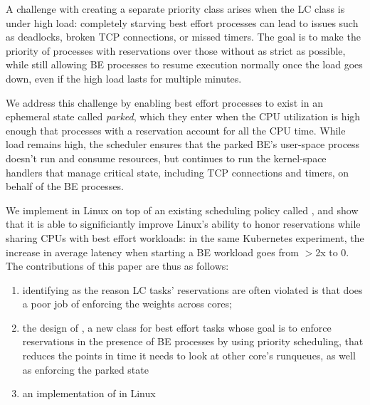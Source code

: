 A challenge with creating a separate priority class arises when the LC class is
under high load: completely starving best effort processes can lead to issues
such as deadlocks, broken TCP connections, or missed timers. The goal is to make
the priority of processes with reservations over those without as strict as
possible, while still allowing BE processes to resume execution normally once
the load goes down, even if the high load lasts for multiple minutes.

We address this challenge by enabling best effort processes to exist in an
ephemeral state called \textit{parked}, which they enter when the CPU
utilization is high enough that processes with a reservation account for all the
CPU time. While load remains high, the scheduler ensures that the parked BE's
user-space process doesn't run and consume resources, but continues to run the
kernel-space handlers that manage critical state, including TCP connections and
timers, on behalf of the BE processes. 

We implement \beclass{} in Linux on top of an existing scheduling policy called
\schedidle{}, and show that it is able to significiantly improve Linux's ability
to honor reservations while sharing CPUs with best effort workloads: in the same
Kubernetes experiment, the increase in average latency when starting a BE
workload goes from $>$2x to 0. The contributions of this paper are thus as
follows: 
\begin{enumerate}
    \item identifying as the reason LC tasks' reservations are often violated is
    that \cgroups{} does a poor job of enforcing the weights across cores;
    \item the design of \beclass{}, a new class for best effort tasks whose goal
    is to enforce reservations in the presence of BE processes by using priority
    scheduling, that reduces the points in time it needs to look at other core's
    runqueues, as well as enforcing the parked state
    \item an implementation of \beclass{} in Linux
\end{enumerate}
